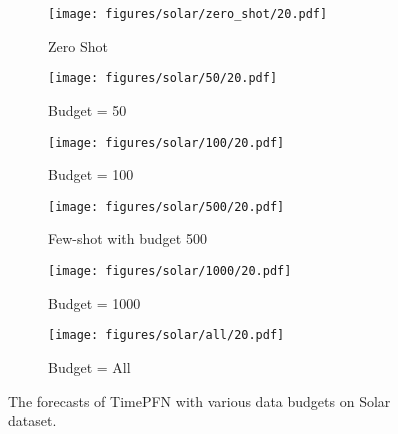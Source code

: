 \begin{figure*}[htp]
\centering

\begin{subfigure}{0.32\textwidth}
\texttt{[image: figures/solar/zero\_shot/20.pdf]}
\caption{Zero Shot}
\end{subfigure}\hfill
\begin{subfigure}{0.32\textwidth}
\texttt{[image: figures/solar/50/20.pdf]}
\caption{Budget = 50}
\end{subfigure}\hfill
\begin{subfigure}{0.32\textwidth}
\texttt{[image: figures/solar/100/20.pdf]}
\caption{Budget = 100}
\end{subfigure}

\begin{subfigure}{0.32\textwidth}
\texttt{[image: figures/solar/500/20.pdf]}
\caption{Few-shot with budget 500}
\end{subfigure}\hfill
\begin{subfigure}{0.32\textwidth}
\texttt{[image: figures/solar/1000/20.pdf]}
\caption{Budget = 1000}
\end{subfigure}\hfill
\begin{subfigure}{0.32\textwidth}
\texttt{[image: figures/solar/all/20.pdf]}
\caption{Budget = All}
\end{subfigure}

\caption{The forecasts of TimePFN with various data budgets on Solar dataset. }
\label{fig:solar20}
\end{figure*}